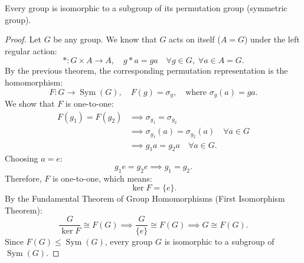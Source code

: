 \begin{corollary}
Every group is isomorphic to a subgroup of its permutation group (symmetric group).
\end{corollary}

\begin{proof}
Let $G$ be any group. We know that $G$ acts on itself ($A = G$) under the left regular action:
\[
* : G \times A \longrightarrow A, \quad g * a = ga \quad \forall g \in G, \; \forall a \in A = G.
\]
By the previous theorem, the corresponding permutation representation is the homomorphism:
\[
F : G \longrightarrow \operatorname{Sym}(G), \quad F(g) = \sigma_g, \quad \text{where } \sigma_g(a) = ga.
\]
We show that $F$ is one-to-one:
\begin{align*}
F(g_1) = F(g_2) &\implies \sigma_{g_1} = \sigma_{g_2} \\
&\implies \sigma_{g_1}(a) = \sigma_{g_2}(a) \quad \forall a \in G \\
&\implies g_1 a = g_2 a \quad \forall a \in G.
\end{align*}
Choosing $a = e$:
\[
g_1 e = g_2 e \implies g_1 = g_2.
\]
Therefore, $F$ is one-to-one, which means:
\[
\ker F = \{e\}.
\]
By the Fundamental Theorem of Group Homomorphisms (First Isomorphism Theorem):
\[
\frac{G}{\ker F} \cong F(G) \implies \frac{G}{\{e\}} \cong F(G) \implies G \cong F(G).
\]
Since $F(G) \le \operatorname{Sym}(G)$, every group $G$ is isomorphic to a subgroup of $\operatorname{Sym}(G)$.
\end{proof}
